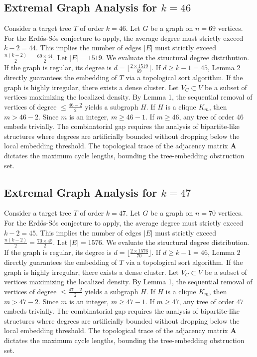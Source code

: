 \documentclass[11pt,a4paper]{article}
\begin{document}
\subsection{Extremal Graph Analysis for $k=46$}
Consider a target tree $T$ of order $k=46$.
Let $G$ be a graph on $n=69$ vertices.
For the Erd\H{o}s-S\'os conjecture to apply, the average degree must strictly exceed $k-2 = 44$.
This implies the number of edges $|E|$ must strictly exceed $\frac{n(k-2)}{2} = \frac{69 \times 44}{2}$.
Let $|E| = 1519$.
We evaluate the structural degree distribution. If the graph is regular, its degree is $d = \lfloor \frac{2 \times 1519}{69} \rfloor$.
If $d \geq k-1 = 45$, Lemma 2 directly guarantees the embedding of $T$ via a topological sort algorithm.
If the graph is highly irregular, there exists a dense cluster. Let $V_C \subset V$ be a subset of vertices maximizing the localized density.
By Lemma 1, the sequential removal of vertices of degree $\leq \frac{46-2}{2}$ yields a subgraph $H$.
If $H$ is a clique $K_{m}$, then $m > 46-2$. Since $m$ is an integer, $m \geq 46-1$. If $m \geq 46$, any tree of order $46$ embeds trivially.
The combinatorial gap requires the analysis of bipartite-like structures where degrees are artificially bounded without dropping below the local embedding threshold. The topological trace of the adjacency matrix $\mathbf{A}$ dictates the maximum cycle lengths, bounding the tree-embedding obstruction set.


\subsection{Extremal Graph Analysis for $k=47$}
Consider a target tree $T$ of order $k=47$.
Let $G$ be a graph on $n=70$ vertices.
For the Erd\H{o}s-S\'os conjecture to apply, the average degree must strictly exceed $k-2 = 45$.
This implies the number of edges $|E|$ must strictly exceed $\frac{n(k-2)}{2} = \frac{70 \times 45}{2}$.
Let $|E| = 1576$.
We evaluate the structural degree distribution. If the graph is regular, its degree is $d = \lfloor \frac{2 \times 1576}{70} \rfloor$.
If $d \geq k-1 = 46$, Lemma 2 directly guarantees the embedding of $T$ via a topological sort algorithm.
If the graph is highly irregular, there exists a dense cluster. Let $V_C \subset V$ be a subset of vertices maximizing the localized density.
By Lemma 1, the sequential removal of vertices of degree $\leq \frac{47-2}{2}$ yields a subgraph $H$.
If $H$ is a clique $K_{m}$, then $m > 47-2$. Since $m$ is an integer, $m \geq 47-1$. If $m \geq 47$, any tree of order $47$ embeds trivially.
The combinatorial gap requires the analysis of bipartite-like structures where degrees are artificially bounded without dropping below the local embedding threshold. The topological trace of the adjacency matrix $\mathbf{A}$ dictates the maximum cycle lengths, bounding the tree-embedding obstruction set.
\end{document}
